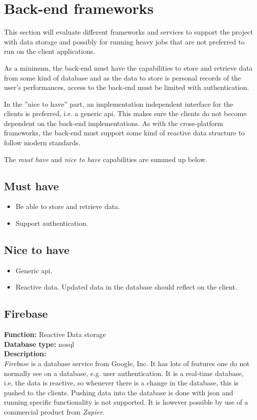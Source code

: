 \section{Back-end frameworks}
This section will evaluate different frameworks and services to support the project with data storage and possibly for running heavy jobs that are not preferred to run on the client applications.

As a minimum, the back-end must have the capabilities to store and retrieve data from some kind of database and as the data to store is personal records of the user's performances, access to the back-end must be limited with authentication.

In the ''nice to have'' part, an implementation independent interface for the clients is preferred, i.e. a generic \gls{api}.
This makes sure the clients do not become dependent on the back-end implementations.
As with the cross-platform frameworks, the back-end must support some kind of reactive data structure to follow modern standards.

The \textit{must have} and \textit{nice to have} capabilities are summed up below.

\subsection*{Must have}
\begin{itemize}
	\item Be able to store and retrieve data.
	\item Support authentication.
\end{itemize}

\subsection*{Nice to have}
\begin{itemize}
	\item Generic \gls{api}.
	\item Reactive data. Updated data in the database should reflect on the client.
\end{itemize}

\subsection*{Firebase}
\textbf{Function:} Reactive Data storage
\\
\textbf{Database type:} \gls{nosql}
\\
\textbf{Description:}
\\
\textit{Firebase} is a database service from Google, Inc.
It has lots of features one do not normally see on a database, e.g. user authentication.
It is a real-time database, i.e. the data is reactive, so whenever there is a change in the database, this is pushed to the clients.
Pushing data into the database is done with \gls{json} and running specific functionality is not supported.
It is however possible by use of a commercial product from  \textit{Zapier}.

